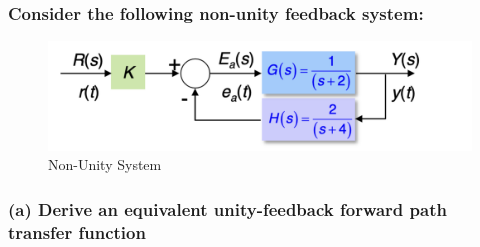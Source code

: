 \documentclass[12pt, letterpaper]{../assignment}
\begin{document}
\subsubsection*{Consider the following non-unity feedback system:}

\begin{figure}[H]
    \centering
    \includegraphics[width=0.7\linewidth]{./figures/Q3_diagram.png}
    \caption{Non-Unity System}
    \label{fig:q3}
\end{figure}

\subsubsection*{(a) Derive an equivalent unity-feedback forward path transfer function}



\end{document}
